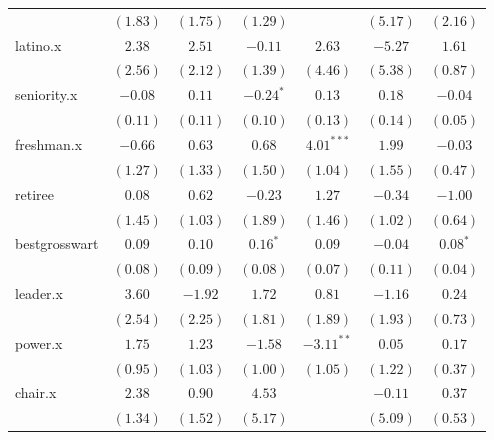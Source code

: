 \documentclass[12pt]{article}
\begin{document}
\begin{table}
\begin{center}
\begin{tabular}{l c c c c c c }
			& $(1.83)$      & $(1.75)$      & $(1.29)$      &                & $(5.17)$       & $(2.16)$      \\
			latino.x                    & $2.38$        & $2.51$        & $-0.11$       & $2.63$         & $-5.27$        & $1.61$        \\
			& $(2.56)$      & $(2.12)$      & $(1.39)$      & $(4.46)$       & $(5.38)$       & $(0.87)$      \\
			seniority.x                 & $-0.08$       & $0.11$        & $-0.24^{*}$   & $0.13$         & $0.18$         & $-0.04$       \\
			& $(0.11)$      & $(0.11)$      & $(0.10)$      & $(0.13)$       & $(0.14)$       & $(0.05)$      \\
			freshman.x                  & $-0.66$       & $0.63$        & $0.68$        & $4.01^{***}$   & $1.99$         & $-0.03$       \\
			& $(1.27)$      & $(1.33)$      & $(1.50)$      & $(1.04)$       & $(1.55)$       & $(0.47)$      \\
			retiree                     & $0.08$        & $0.62$        & $-0.23$       & $1.27$         & $-0.34$        & $-1.00$       \\
			& $(1.45)$      & $(1.03)$      & $(1.89)$      & $(1.46)$       & $(1.02)$       & $(0.64)$      \\
			bestgrosswart               & $0.09$        & $0.10$        & $0.16^{*}$    & $0.09$         & $-0.04$        & $0.08^{*}$    \\
			& $(0.08)$      & $(0.09)$      & $(0.08)$      & $(0.07)$       & $(0.11)$       & $(0.04)$      \\
			leader.x                    & $3.60$        & $-1.92$       & $1.72$        & $0.81$         & $-1.16$        & $0.24$        \\
			& $(2.54)$      & $(2.25)$      & $(1.81)$      & $(1.89)$       & $(1.93)$       & $(0.73)$      \\
			power.x                     & $1.75$        & $1.23$        & $-1.58$       & $-3.11^{**}$   & $0.05$         & $0.17$        \\
			& $(0.95)$      & $(1.03)$      & $(1.00)$      & $(1.05)$       & $(1.22)$       & $(0.37)$      \\
			chair.x                     & $2.38$        & $0.90$        & $4.53$        &                & $-0.11$        & $0.37$        \\
			& $(1.34)$      & $(1.52)$      & $(5.17)$      &                & $(5.09)$       & $(0.53)$      \\

\end{tabular}
\end{center}
\end{table}
\end{document}
